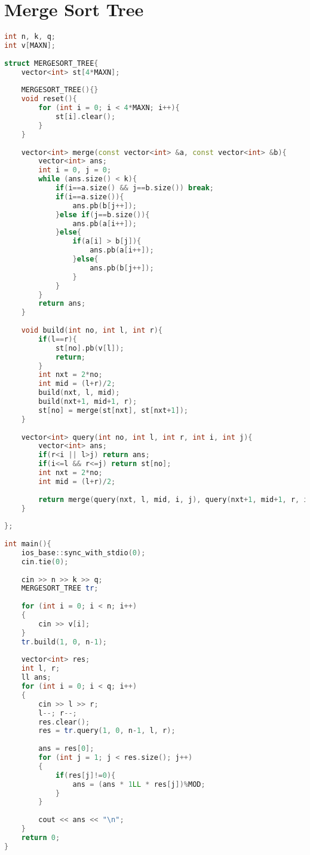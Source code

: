 \documentclass[12pt,a4paper,twoside]{report}
\begin{document}
\section{Merge Sort Tree}
\noindent\begin{lstlisting}[caption=Merge Sort Tree,language=C++]
int n, k, q;
int v[MAXN];
 
struct MERGESORT_TREE{
    vector<int> st[4*MAXN];
     
    MERGESORT_TREE(){}
    void reset(){
        for (int i = 0; i < 4*MAXN; i++){
            st[i].clear();
        }
    }
     
    vector<int> merge(const vector<int> &a, const vector<int> &b){
        vector<int> ans;
        int i = 0, j = 0;
        while (ans.size() < k){
            if(i==a.size() && j==b.size()) break;
            if(i==a.size()){
                ans.pb(b[j++]);
            }else if(j==b.size()){
                ans.pb(a[i++]);
            }else{
                if(a[i] > b[j]){
                    ans.pb(a[i++]);
                }else{
                    ans.pb(b[j++]);
                }
            }
        }
        return ans;
    }
     
    void build(int no, int l, int r){
        if(l==r){
            st[no].pb(v[l]);
            return;
        }
        int nxt = 2*no;
        int mid = (l+r)/2;
        build(nxt, l, mid);
        build(nxt+1, mid+1, r);
        st[no] = merge(st[nxt], st[nxt+1]);
    }
     
    vector<int> query(int no, int l, int r, int i, int j){
        vector<int> ans;
        if(r<i || l>j) return ans;
        if(i<=l && r<=j) return st[no];
        int nxt = 2*no;
        int mid = (l+r)/2;
         
        return merge(query(nxt, l, mid, i, j), query(nxt+1, mid+1, r, i, j));
    }
 
};
 
int main(){
    ios_base::sync_with_stdio(0);
    cin.tie(0);
     
    cin >> n >> k >> q;
    MERGESORT_TREE tr;
     
    for (int i = 0; i < n; i++)
    {
        cin >> v[i];
    }
    tr.build(1, 0, n-1);
     
    vector<int> res;
    int l, r;
    ll ans;
    for (int i = 0; i < q; i++)
    {
        cin >> l >> r;
        l--; r--;
        res.clear();
        res = tr.query(1, 0, n-1, l, r);
         
        ans = res[0];
        for (int j = 1; j < res.size(); j++)
        {
            if(res[j]!=0){
                ans = (ans * 1LL * res[j])%MOD;
            }
        }
         
        cout << ans << "\n";
    }    
    return 0;
}
\end{lstlisting}
\end{document}
